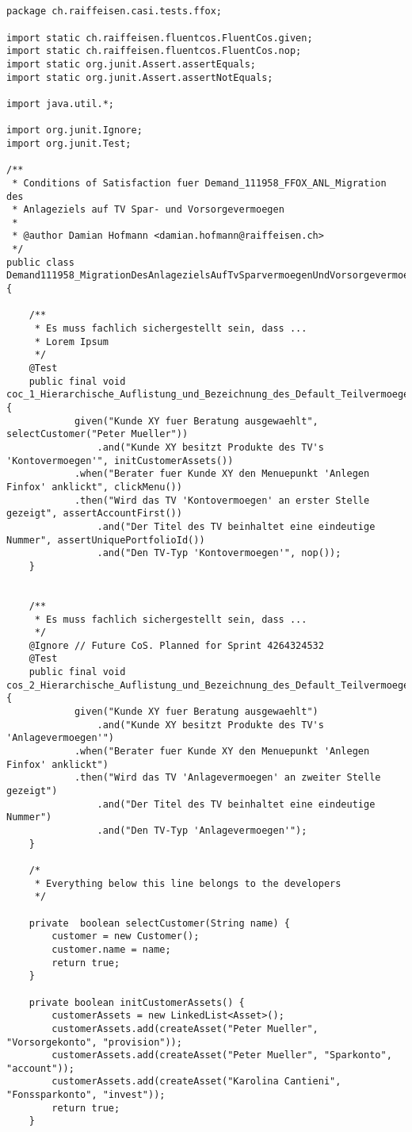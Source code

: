 \begin{lstlisting}[caption=Demand111958.java, label=code:fluent_demand]


package ch.raiffeisen.casi.tests.ffox;

import static ch.raiffeisen.fluentcos.FluentCos.given;
import static ch.raiffeisen.fluentcos.FluentCos.nop;
import static org.junit.Assert.assertEquals;
import static org.junit.Assert.assertNotEquals;

import java.util.*;

import org.junit.Ignore;
import org.junit.Test;

/**
 * Conditions of Satisfaction fuer Demand_111958_FFOX_ANL_Migration des
 * Anlageziels auf TV Spar- und Vorsorgevermoegen
 * 
 * @author Damian Hofmann <damian.hofmann@raiffeisen.ch>
 */
public class Demand111958_MigrationDesAnlagezielsAufTvSparvermoegenUndVorsorgevermoegen {

	/**
	 * Es muss fachlich sichergestellt sein, dass ...
	 * Lorem Ipsum
	 */
	@Test
	public final void coc_1_Hierarchische_Auflistung_und_Bezeichnung_des_Default_Teilvermoegens_Kontovermoegen() {
			given("Kunde XY fuer Beratung ausgewaehlt", selectCustomer("Peter Mueller"))
				.and("Kunde XY besitzt Produkte des TV's 'Kontovermoegen'", initCustomerAssets())
			.when("Berater fuer Kunde XY den Menuepunkt 'Anlegen Finfox' anklickt", clickMenu())
			.then("Wird das TV 'Kontovermoegen' an erster Stelle gezeigt", assertAccountFirst())
				.and("Der Titel des TV beinhaltet eine eindeutige Nummer", assertUniquePortfolioId())
				.and("Den TV-Typ 'Kontovermoegen'", nop());
	}
		
	
	/**
	 * Es muss fachlich sichergestellt sein, dass ...
	 */
	@Ignore // Future CoS. Planned for Sprint 4264324532
	@Test
	public final void cos_2_Hierarchische_Auflistung_und_Bezeichnung_des_Default_Teilvermoegens_Anlagevermoegen() {
			given("Kunde XY fuer Beratung ausgewaehlt")
				.and("Kunde XY besitzt Produkte des TV's 'Anlagevermoegen'")
			.when("Berater fuer Kunde XY den Menuepunkt 'Anlegen Finfox' anklickt")
			.then("Wird das TV 'Anlagevermoegen' an zweiter Stelle gezeigt")
				.and("Der Titel des TV beinhaltet eine eindeutige Nummer")
				.and("Den TV-Typ 'Anlagevermoegen'");
	}
	
	/*
	 * Everything below this line belongs to the developers
	 */
	
	private  boolean selectCustomer(String name) {
		customer = new Customer();
		customer.name = name;
		return true;
	}

	private boolean initCustomerAssets() {
		customerAssets = new LinkedList<Asset>();
		customerAssets.add(createAsset("Peter Mueller", "Vorsorgekonto", "provision"));
		customerAssets.add(createAsset("Peter Mueller", "Sparkonto", "account"));
		customerAssets.add(createAsset("Karolina Cantieni", "Fonssparkonto", "invest"));
		return true;
	}


\end{lstlisting}
